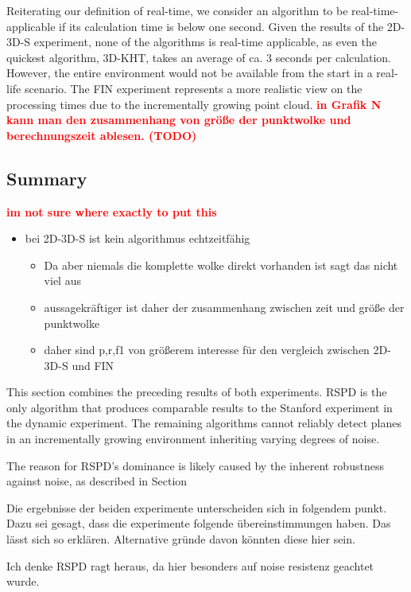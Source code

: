 \documentclass[main.tex]{subfiles}
\begin{document}
Reiterating our definition of real-time, we consider an algorithm to be real-time-applicable if its calculation time is below one second.
Given the results of the 2D-3D-S experiment, none of the algorithms is real-time applicable, as even the quickest algorithm, 3D-KHT, takes 
an average of ca. 3 seconds per calculation. 
However, the entire environment would not be available from the start in a real-life scenario. The FIN experiment represents a more realistic 
view on the processing times due to the incrementally growing point cloud. \textbf{\textcolor{red}{in Grafik N kann man den zusammenhang
von größe der punktwolke und berechnungszeit ablesen. (TODO)}}

\subsection{Summary}

\textbf{\textcolor{red}{im not sure where exactly to put this}}
\begin{itemize}
    \item bei 2D-3D-S ist kein algorithmus echtzeitfähig
          \begin{itemize}
              \item Da aber niemals die komplette wolke direkt vorhanden ist sagt das nicht viel aus
              \item aussagekräftiger ist daher der zusammenhang zwischen zeit und größe der punktwolke
              \item daher sind p,r,f1 von größerem interesse für den vergleich zwischen 2D-3D-S und FIN
          \end{itemize}
\end{itemize}


This section combines the preceding results of both experiments.
RSPD is the only algorithm that produces comparable results to the Stanford experiment in the dynamic experiment.
The remaining algorithms cannot reliably detect planes in an incrementally growing environment inheriting varying degrees of noise.

The reason for RSPD's dominance is likely caused by the inherent robustness against noise, as described in Section~

Die ergebnisse der beiden experimente unterscheiden sich in folgendem punkt. Dazu sei gesagt, dass die experimente folgende übereinstimmungen haben.
Das lässt sich so erklären. Alternative gründe davon könnten diese hier sein.

Ich denke RSPD ragt heraus, da hier besonders auf noise resistenz geachtet wurde. %
\end{document}
